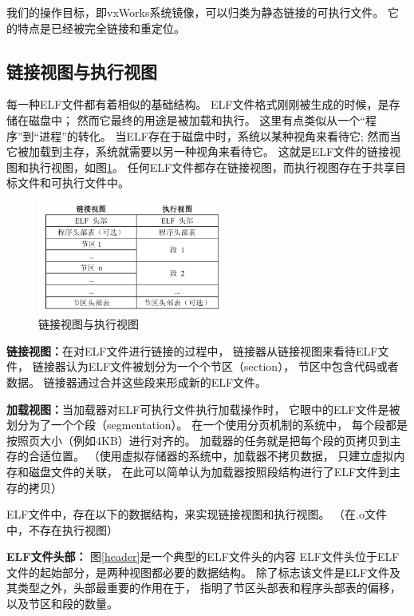 我们的操作目标，即vxWorks系统镜像，可以归类为静态链接的可执行文件。
它的特点是已经被完全链接和重定位。

\subsection{链接视图与执行视图}

每一种ELF文件都有着相似的基础结构。
ELF文件格式刚刚被生成的时候，是存储在磁盘中；
然而它最终的用途是被加载和执行。
这里有点类似从一个“程序”到“进程”的转化。
当ELF存在于磁盘中时，系统以某种视角来看待它;
然而当它被加载到主存，系统就需要以另一种视角来看待它。
这就是ELF文件的链接视图和执行视图，如图\ref{elf-map}。
任何ELF文件都存在链接视图，而执行视图存在于共享目标文件和可执行文件中。

\begin{figure}[h!]
  \centering
  \includegraphics[width=0.55\textwidth]{figure/elf-map.png}
  \caption{链接视图与执行视图}
  \label{elf-map}
\end{figure}

\textbf{链接视图：}在对ELF文件进行链接的过程中，
链接器从链接视图来看待ELF文件，
链接器认为ELF文件被划分为一个个节区（section），
节区中包含代码或者数据。
链接器通过合并这些段来形成新的ELF文件。

\textbf{加载视图：}当加载器对ELF可执行文件执行加载操作时，
它眼中的ELF文件是被划分为了一个个段（segmentation）。
在一个使用分页机制的系统中，
每个段都是按照页大小（例如4KB）进行对齐的。
加载器的任务就是把每个段的页拷贝到主存的合适位置。
（使用虚拟存储器的系统中，加载器不拷贝数据，
只建立虚拟内存和磁盘文件的关联，
在此可以简单认为加载器按照段结构进行了ELF文件到主存的拷贝）

ELF文件中，存在以下的数据结构，来实现链接视图和执行视图。
（在.o文件中，不存在执行视图）



\textbf{ELF文件头部：}
图\ref{header}是一个典型的ELF文件头的内容
ELF文件头位于ELF文件的起始部分，是两种视图都必要的数据结构。
除了标志该文件是ELF文件及其类型之外，头部最重要的作用在于，
指明了节区头部表和程序头部表的偏移，以及节区和段的数量。

